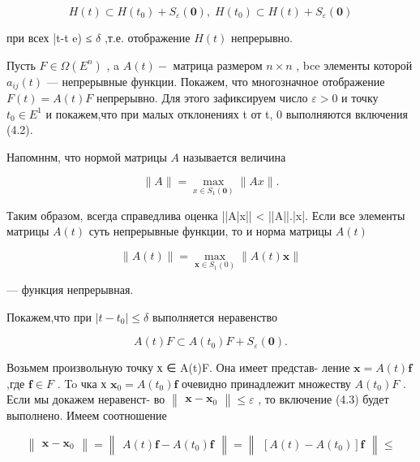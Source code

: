 \documentclass[8pt]{extarticle}
\begin{document}
\[
H\left( t\right)  \subset  H\left( {t}_{0}\right)  + {S}_{\varepsilon }\left( \mathbf{0}\right) ,\;H\left( {t}_{0}\right)  \subset  H\left( t\right)  + {S}_{\varepsilon }\left( \mathbf{0}\right)
\]

при всех |t-t e) ≤ \(\delta\) ,т.е. отображение \(H\left( t\right)\) непрерывно.

Пусть \(F \in  \Omega \left( {E}^{n}\right)\) , a \(A\left( t\right)  -\) матрица размером \(n \times  n\) , bce элементы которой \({a}_{ij}\left( t\right)\) — непрерывные функции. Покажем, что многозначное отображение \(F\left( t\right)  = A\left( t\right) F\) непрерывно. Для этого зафиксируем число \(\varepsilon  > 0\) и точку \({t}_{0} \in  {E}^{1}\) и покажем,что при малых отклонениях t от t, 0 выполняются включения (4.2).

Напомннм, что нормой матрицы \(A\) называется величина

\[
\parallel A\parallel  = \mathop{\max }\limits_{{x \in  {S}_{1}\left( \mathbf{0}\right) }}\parallel {Ax}\parallel .
\]

Таким образом, всегда справедлива оценка ||A|x|| < ||A||.|x|. Если все элементы матрицы \(A\left( t\right)\) суть непрерывные функции, то и норма матрицы \(A\left( t\right)\)

\[
\parallel A\left( t\right) \parallel  = \mathop{\max }\limits_{{\mathbf{x} \in  {S}_{1}\left( 0\right) }}\parallel A\left( t\right) \mathbf{x}\parallel
\]

— функция непрерывная.

Покажем,что при \(\left| {t - {t}_{0}}\right|  \leq  \delta\) выполняется неравенство

\[
A\left( t\right) F \subset  A\left( {t}_{0}\right) F + {S}_{\varepsilon }\left( \mathbf{0}\right) . \tag{4.3}
\]

Возьмем произвольную точку х ∈ A(t)F. Она имеет представ- ление \(\mathbf{x} = A\left( t\right) \mathbf{f}\) ,где \(\mathbf{f} \in  F\) . To чка х \({\mathbf{x}}_{0} = A\left( {t}_{0}\right) \mathbf{f}\) очевидно принадлежит множеству \(A\left( {t}_{0}\right) F\) . Если мы докажем неравенст- во \(\left\lVert \begin{array}{c} {\mathbf{x} - {\mathbf{x}}_{0}} \end{array} \right\rVert \leq  \varepsilon\) , то включение (4.3) будет выполнено. Имеем соотношение

\[
\left\lVert \begin{array}{c} {\mathbf{x} - {\mathbf{x}}_{0}} \end{array} \right\rVert = \left\lVert \begin{array}{c} {A\left( t\right) \mathbf{f} - A\left( {t}_{0}\right) \mathbf{f}} \end{array} \right\rVert = \left\lVert \begin{array}{c} {\left\lbrack  {A\left( t\right)  - A\left( {t}_{0}\right) }\right\rbrack  \mathbf{f}} \end{array} \right\rVert \leq
\]
\end{document}
